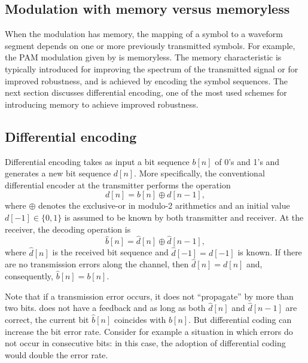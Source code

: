 \subsection{Modulation with memory versus memoryless}
	
When the modulation has memory, the mapping of a symbol to a waveform segment depends on one or more previously transmitted symbols. For example, the PAM modulation given by  is memoryless.
The memory characteristic is typically introduced for improving the spectrum of the transmitted signal or for improved robustness, and is achieved by encoding the symbol sequences. The next section discusses differential encoding, one of the most used schemes for introducing memory to achieve improved robustness.
	
\subsection{Differential encoding}
\label{sec:differentialEncoding}

Differential encoding takes as input a bit sequence $b[n]$ of 0's and 1's and generates a new bit sequence $d[n]$.
More specifically, the conventional differential encoder at the transmitter performs the operation
\begin{equation}
d[n] = b[n] \oplus d[n-1],
\label{eq:differential_encoding}
\end{equation}
where $\oplus$ denotes the exclusive-or in modulo-2 arithmetics and an initial value $d[-1] \in \{0,1\}$ is assumed to be known by both transmitter and receiver. At the receiver, the decoding operation is
\begin{equation}
\hat b[n] = \hat d[n] \oplus \hat d[n-1],
\label{eq:differential_decoding}
\end{equation}
where $\hat d[n]$ is the received bit sequence and $\hat d[-1]= d[-1]$ is known. If there are no transmission errors along the channel, then $\hat d[n]=d[n]$ and, consequently, $\hat b[n]=b[n]$.

Note that if a transmission error occurs, it does not ``propagate'' by more than two bits.
does not have a feedback and as long as both $\hat d[n]$ and $\hat d[n-1]$ are correct, the 
current bit $\hat b[n]$ coincides with $b[n]$. 
But differential coding can increase the bit error rate. Consider for example a situation in
which errors do not occur in consecutive bits: in this case, the adoption of differential coding 
would double the error rate.

